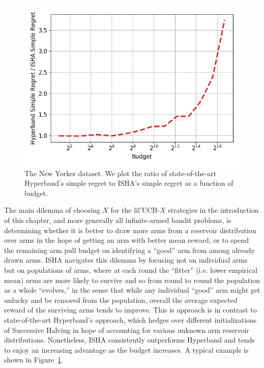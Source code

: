 \begin{figure}
\includegraphics[width=.45\textwidth]{fixedbudget/figures/NY.png}
\caption{The New Yorker dataset. We plot the ratio of state-of-the-art 
Hyperband's simple regret to ISHA's simple regret as a function of
budget. }
\label{fig:isha_vs_hb_improvement}
\vspace{-1.5em}
\end{figure}

The main dilemma of choosing $X$ for the lil'UCB-$X$ strategies in the introduction of this chapter, and more generally all infinite-armed bandit problems, is determining whether it is better to draw more arms from a reservoir distribution over arms in the hope of getting an arm with better mean reward, or to spend the remaining arm pull budget on identifying a ``good'' arm from among already drawn arms.
ISHA navigates this dilemma by focusing not on individual arms but on populations of arms, where at each round the ``fitter'' (i.e. lower empirical mean) arms are more likely to survive and so from round to round the population as a whole ``evolves,'' in the sense that while any individual ``good'' arm might get unlucky and be removed from the population, overall the average expected reward of the surviving arms tends to improve. This is approach is in contrast to state-of-the-art Hyperband's approach, which hedges over different initializations of Successive Halving in hope of accounting for various unknown arm reservoir distributions. Nonetheless, ISHA consistently outperforms Hyperband and tends to enjoy
an increasing advantage as the budget increases.
A typical example is shown in Figure~\ref{fig:isha_vs_hb_improvement}.






